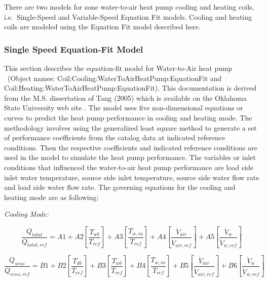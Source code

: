 There are two models for zone water-to-air heat pump cooling and heating coils, i.e.~Single-Speed and Variable-Speed Equation Fit models. Cooling and heating coils are modeled using the Equation Fit model described here.

\subsubsection{Single Speed Equation-Fit Model}\label{single-speed-equation-fit-model-000}

This section describes the equation-fit model for Water-to-Air heat pump ~(Object names: Coil:Cooling:WaterToAirHeatPump:EquationFit and Coil:Heating:WaterToAirHeatPump:EquationFit). This documentation is derived from the M.S. dissertation of Tang (2005) which is available on the Oklahoma State University web site . The model uses five non-dimensional equations or curves to predict the heat pump performance in cooling and heating mode. The methodology involves using the generalized least square method to generate a set of performance coefficients from the catalog data at indicated reference conditions. Then the respective coefficients and indicated reference conditions are used in the model to simulate the heat pump performance. The variables or inlet conditions that influenced the water-to-air heat pump performance are load side inlet water temperature, source side inlet temperature, source side water flow rate and load side water flow rate. The governing equations for the cooling and heating mode are as following:

\emph{Cooling Mode:}

\begin{equation}
\frac{{{Q_{total}}}}{{{Q_{total,ref}}}} = A1 + A2\left[ {\frac{{{T_{wb}}}}{{{T_{ref}}}}} \right] + A3\left[ {\frac{{{T_{w,in}}}}{{{T_{ref}}}}} \right] + A4\left[ {\frac{{{{\dot V}_{air}}}}{{{{\dot V}_{air,ref}}}}} \right] + A5\left[ {\frac{{{{\dot V}_w}}}{{{{\dot V}_{w,ref}}}}} \right]
\end{equation}

\begin{equation}
\frac{{{Q_{sens}}}}{{{Q_{sens,ref}}}} = B1 + B2\left[ {\frac{{{T_{db}}}}{{{T_{ref}}}}} \right] + B3\left[ {\frac{{{T_{wb}}}}{{{T_{ref}}}}} \right] + B4\left[ {\frac{{{T_{w,in}}}}{{{T_{ref}}}}} \right] + B5\left[ {\frac{{{{\dot V}_{air}}}}{{{{\dot V}_{air,ref}}}}} \right] + B6\left[ {\frac{{{{\dot V}_w}}}{{{{\dot V}_{w,ref}}}}} \right]
\end{equation}

